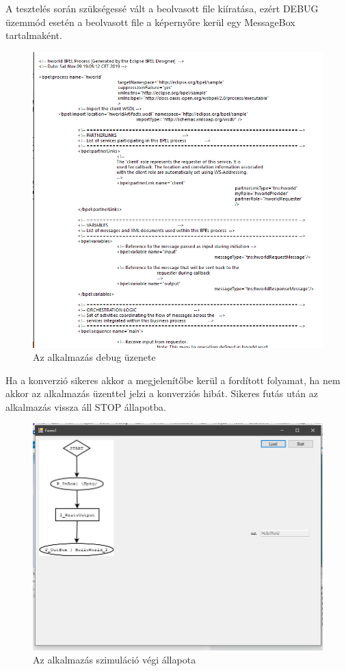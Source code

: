 A tesztelés során szükségessé vált a beolvasott file kiíratása, ezért DEBUG üzemmód esetén a beolvasott file a képernyőre kerül egy MessageBox tartalmaként.
\begin{figure}[h!]
\centering
\includegraphics[scale=0.4]{images/debug.png}
\caption{Az alkalmazás debug üzenete}
\end{figure}

Ha a konverzió sikeres akkor a megjelenítőbe kerül a fordított folyamat, ha nem akkor az alkalmazás üzenttel jelzi a konverziós hibát. Sikeres futás után az alkalmazás vissza áll STOP állapotba.
\begin{figure}[h!]
\centering
\includegraphics[scale=0.4]{images/done.png}
\caption{Az alkalmazás szimuláció végi állapota}
\end{figure}
\newpage
